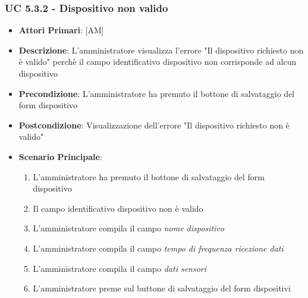 			\subsubsection{UC 5.3.2 - Dispositivo non valido}
			\begin{itemize}
				\item \textbf{Attori Primari}: [AM]
				\item \textbf{Descrizione}: L'amministratore visualizza l'errore "Il dispositivo richiesto non è valido" perchè il campo identificativo dispositivo non corrisponde ad alcun dispositivo
				\item \textbf{Precondizione}: L'amministratore ha premuto il bottone di salvataggio del form dispositivo
				\item \textbf{Postcondizione}: Visualizzazione dell'errore "Il dispositivo richiesto non è valido"
				\item \textbf{Scenario Principale}:
				\begin{enumerate}
					\item{L'amministratore ha premuto il bottone di salvataggio del form dispositivo}
					\item{Il campo identificativo dispositivo non è valido}
					\item{L'amministratore compila il campo \textit{nome dispositivo}}
					\item{L'amministratore compila il campo \textit{tempo di frequenza ricezione dati}}
					\item{L'amministratore compila il campo \textit{dati sensori}}
					\item{L'amministratore preme sul buttone di salvataggio del form dispositivi}
				\end{enumerate}
			\end{itemize}
			
